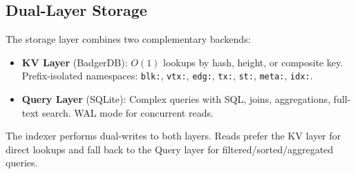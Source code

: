 \subsection{Dual-Layer Storage}

\begin{definition}
The storage layer combines two complementary backends:
\begin{itemize}
  \item \textbf{KV Layer} (BadgerDB): $O(1)$ lookups by hash, height, or composite key.
        Prefix-isolated namespaces: \texttt{blk:}, \texttt{vtx:}, \texttt{edg:}, \texttt{tx:},
        \texttt{st:}, \texttt{meta:}, \texttt{idx:}.
  \item \textbf{Query Layer} (SQLite): Complex queries with SQL, joins, aggregations,
        full-text search. WAL mode for concurrent reads.
\end{itemize}
\end{definition}

The indexer performs dual-writes to both layers. Reads prefer the KV layer for direct
lookups and fall back to the Query layer for filtered/sorted/aggregated queries.

